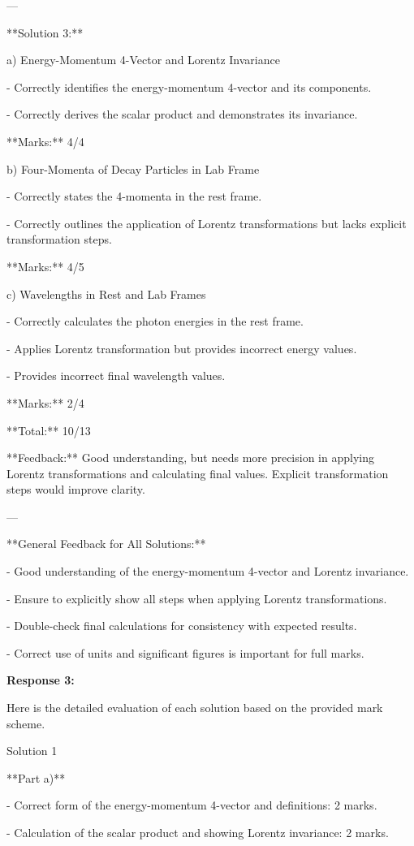 \documentclass[a4paper,11pt]{article}
\begin{document}
---

**Solution 3:**

a) Energy-Momentum 4-Vector and Lorentz Invariance

- Correctly identifies the energy-momentum 4-vector and its components.

- Correctly derives the scalar product and demonstrates its invariance.

**Marks:** 4/4

b) Four-Momenta of Decay Particles in Lab Frame

- Correctly states the 4-momenta in the rest frame.

- Correctly outlines the application of Lorentz transformations but lacks explicit transformation steps.

**Marks:** 4/5

c) Wavelengths in Rest and Lab Frames

- Correctly calculates the photon energies in the rest frame.

- Applies Lorentz transformation but provides incorrect energy values.

- Provides incorrect final wavelength values.

**Marks:** 2/4

**Total:** 10/13

**Feedback:** Good understanding, but needs more precision in applying Lorentz transformations and calculating final values. Explicit transformation steps would improve clarity.

---

**General Feedback for All Solutions:**

- Good understanding of the energy-momentum 4-vector and Lorentz invariance.

- Ensure to explicitly show all steps when applying Lorentz transformations.

- Double-check final calculations for consistency with expected results.

- Correct use of units and significant figures is important for full marks.

\bigskip
\textbf{Response 3:}

Here is the detailed evaluation of each solution based on the provided mark scheme.

Solution 1

**Part a)**

- Correct form of the energy-momentum 4-vector and definitions: 2 marks.

- Calculation of the scalar product and showing Lorentz invariance: 2 marks.
\end{document}
